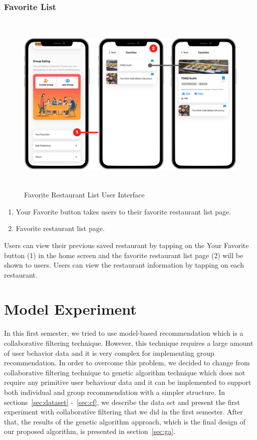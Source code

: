 \documentclass[12pt,oneside,openright,a4paper]{cpe-english-project}
\begin{document}
\newpage
\subsubsection{Favorite List}
\begin{figure}[H]\centering
\includegraphics[height=250pt]{./images/4ui_FavoriteRestaurantListUserInterface.png}
\caption{Favorite Restaurant List User Interface}\label{fig:4ui_FavoriteRestaurantListUserInterface}
\end{figure}\vspace{-24pt}

\begin{enumerate}
\item Your Favorite button takes users to their favorite restaurant list page.
\item Favorite restaurant list page.
\end{enumerate}

Users can view their previous saved restaurant by tapping on the Your Favorite button (1) in the home screen and the favorite restaurant list page (2) will be shown to users. Users can view the restaurant information by tapping on each restaurant.


\section{Model Experiment}

In this first semester, we tried to use model-based recommendation which is a collaborative filtering technique. However, this technique requires a large amount of user behavior data and it is very complex for implementing group recommendation. In order to overcome this problem, we decided to change from collaborative filtering technique to genetic algorithm technique which does not require any primitive user behaviour data and it can be implemented to support both individual and group recommendation with a simpler structure. In sections~\ref{sec:dataset} -~\ref{sec:cf}, we describe the data set and present the first experiment with collaborative filtering that we did in the first semester. After that, the results of the genetic algorithm approach, which is the final design of our proposed algorithm, is presented in section~\ref{sec:ga}.
\end{document}
